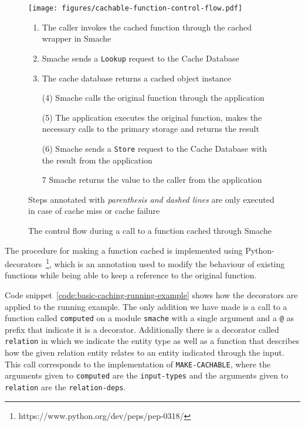 \begin{figure*}[ht!]
  \begin{center}
    \texttt{[image: figures/cachable-function-control-flow.pdf]}
  \end{center}
  \begin{enumerate}
    \item The caller invokes the cached function through the cached wrapper in Smache
    \item Smache sends a \verb$Lookup$ request to the Cache Database
    \item The cache database returns a cached object instance
    \item[(4)] Smache calls the original function through the application
    \item[(5)] The application executes the original function, makes the necessary calls to the primary storage and returns the result
    \item[(6)] Smache sends a \verb$Store$ request to the Cache Database with the result from the application
    \item[7] Smache returns the value to the caller from the application
  \end{enumerate}
  \footnotesize{Steps annotated with \emph{parenthesis and dashed lines} are only executed in case of cache miss or cache failure}
  \caption{The control flow during a call to a function cached through Smache}
  \label{fig:cachable-function-control-flow}
\end{figure*}

The procedure for making a function cached is implemented using Python-decorators~\footnote{https://www.python.org/dev/peps/pep-0318/}, which is an annotation used to modify the behaviour of existing functions while being able to keep a reference to the original function.

Code snippet~\ref{code:basic-caching-running-example} shows how the decorators are applied to the running example. The only addition we have made is a call to a function called \verb$computed$ on a module \verb$smache$ with a single argument and a \verb$@$ as prefix that indicate it is a decorator. Additionally there is a decorator called \verb$relation$ in which we indicate the entity type as well as a function that describes how the given relation entity relates to an entity indicated through the input. This call corresponds to the implementation of \verb$MAKE-CACHABLE$, where the arguments given to \verb$computed$ are the \verb$input-types$ and the arguments given to \verb$relation$ are the \verb$relation-deps$.

